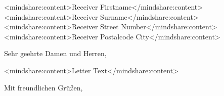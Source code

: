 \documentclass[
fontsize=11pt,
paper=a4,
headsepline,
footsepline,
parskip=false
]{scrlttr2}
\begin{document}
\begin{letter}{%
<mindshare:content>Receiver Firstname</mindshare:content><mindshare:content>Receiver Surname</mindshare:content>\\ 
<mindshare:content>Receiver Street Number</mindshare:content>\\ 
<mindshare:content>Receiver Postalcode City</mindshare:content>
}

\opening{Sehr geehrte Damen und Herren,}


<mindshare:content>Letter Text</mindshare:content>


\closing{Mit freundlichen Grüßen,}






  
\end{letter}
\end{document}
